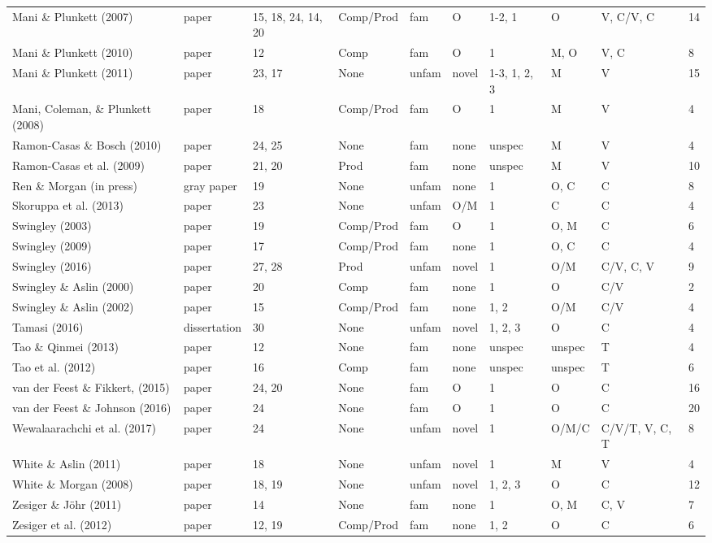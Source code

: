 \documentclass[man]{apa6}
\newenvironment{lltable}{\begin{landscape}\begin{center}\begin{ThreePartTable}}{\end{ThreePartTable}\end{center}\end{landscape}}
\theoremstyle{definition}
\theoremstyle{definition}
\theoremstyle{definition}
\theoremstyle{remark}
\begin{document}
\begin{lltable}
{\begin{longtable}{llllllllll}
Mani \& Plunkett (2007) & paper & 15, 18, 24, 14, 20 & Comp/Prod & fam & O & 1-2, 1 & O & V, C/V, C & 14\\
Mani \& Plunkett (2010) & paper & 12 & Comp & fam & O & 1 & M, O & V, C & 8\\
Mani \& Plunkett (2011) & paper & 23, 17 & None & unfam & novel & 1-3, 1, 2, 3 & M & V & 15\\
Mani, Coleman, \& Plunkett (2008) & paper & 18 & Comp/Prod & fam & O & 1 & M & V & 4\\
Ramon-Casas \& Bosch (2010) & paper & 24, 25 & None & fam & none & unspec & M & V & 4\\
Ramon-Casas et al. (2009) & paper & 21, 20 & Prod & fam & none & unspec & M & V & 10\\
Ren \& Morgan (in press) & gray paper & 19 & None & unfam & none & 1 & O, C & C & 8\\
Skoruppa et al. (2013) & paper & 23 & None & unfam & O/M & 1 & C & C & 4\\
Swingley (2003) & paper & 19 & Comp/Prod & fam & O & 1 & O, M & C & 6\\
Swingley (2009) & paper & 17 & Comp/Prod & fam & none & 1 & O, C & C & 4\\
Swingley (2016) & paper & 27, 28 & Prod & unfam & novel & 1 & O/M & C/V, C, V & 9\\
Swingley \& Aslin (2000) & paper & 20 & Comp & fam & none & 1 & O & C/V & 2\\
Swingley \& Aslin (2002) & paper & 15 & Comp/Prod & fam & none & 1, 2 & O/M & C/V & 4\\
Tamasi (2016) & dissertation & 30 & None & unfam & novel & 1, 2, 3 & O & C & 4\\
Tao \& Qinmei (2013) & paper & 12 & None & fam & none & unspec & unspec & T & 4\\
Tao et al. (2012) & paper & 16 & Comp & fam & none & unspec & unspec & T & 6\\
van der Feest \& Fikkert, (2015) & paper & 24, 20 & None & fam & O & 1 & O & C & 16\\
van der Feest \& Johnson (2016) & paper & 24 & None & fam & O & 1 & O & C & 20\\
Wewalaarachchi et al. (2017) & paper & 24 & None & unfam & novel & 1 & O/M/C & C/V/T, V, C, T & 8\\
White \& Aslin (2011) & paper & 18 & None & unfam & novel & 1 & M & V & 4\\
White \& Morgan (2008) & paper & 18, 19 & None & unfam & novel & 1, 2, 3 & O & C & 12\\
Zesiger \& Jöhr (2011) & paper & 14 & None & fam & none & 1 & O, M & C, V & 7\\
Zesiger et al. (2012) & paper & 12, 19 & Comp/Prod & fam & none & 1, 2 & O & C & 6\\
\bottomrule
\end{longtable}
}
\end{lltable}
\end{document}
